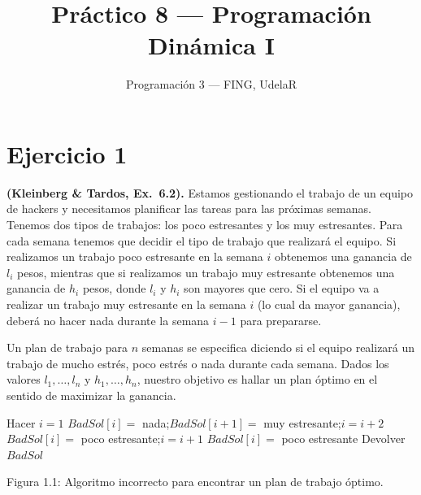 

\title{Práctico 8 --- Programación Dinámica I}
\author{Programación 3 --- FING, UdelaR}
\date{}


\maketitle

\section{Ejercicio 1}

\begin{enunciado}
\textbf{(Kleinberg \& Tardos, Ex.~6.2).} Estamos gestionando el trabajo de un equipo de hackers y necesitamos planificar las tareas para las próximas semanas. Tenemos dos tipos de trabajos: los poco estresantes y los muy estresantes. Para cada semana tenemos que decidir el tipo de trabajo que realizará el equipo. Si realizamos un trabajo poco estresante en la semana $i$ obtenemos una ganancia de $l_i$ pesos, mientras que si realizamos un trabajo muy estresante obtenemos una ganancia de $h_i$ pesos, donde $l_i$ y $h_i$ son mayores que cero. Si el equipo va a realizar un trabajo muy estresante en la semana $i$ (lo cual da mayor ganancia), deberá no hacer nada durante la semana $i-1$ para prepararse.

Un plan de trabajo para $n$ semanas se especifica diciendo si el equipo realizará un trabajo de mucho estrés, poco estrés o nada durante cada semana. Dados los valores $l_1,\dots,l_n$ y $h_1,\dots,h_n$, nuestro objetivo es hallar un plan óptimo en el sentido de maximizar la ganancia.

\begin{algorithmic}[1]
\State Hacer $i=1$
    \State $BadSol[i]=$ nada;\quad $BadSol[i+1]=$ muy estresante;\quad $i=i+2$
  \Else
    \State $BadSol[i]=$ poco estresante;\quad $i=i+1$
  \EndIf
\EndWhile
{} $BadSol[i]=$ poco estresante \EndIf
\State Devolver $BadSol$
\end{algorithmic}
\centerline{Figura 1.1: Algoritmo incorrecto para encontrar un plan de trabajo óptimo.}


\end{enunciado}
